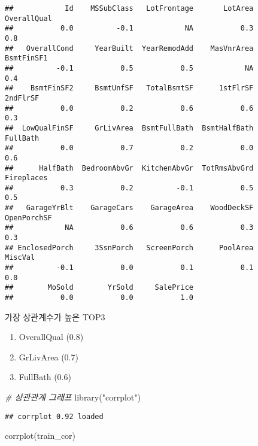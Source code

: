 \documentclass[
]{article}
\newenvironment{Shaded}{\begin{snugshade}}{\end{snugshade}}
\newcommand{\CommentTok}[1]{\textcolor[rgb]{0.56,0.35,0.01}{\textit{#1}}}
\newcommand{\FunctionTok}[1]{\textcolor[rgb]{0.00,0.00,0.00}{#1}}
\newcommand{\NormalTok}[1]{#1}
\newcommand{\StringTok}[1]{\textcolor[rgb]{0.31,0.60,0.02}{#1}}
\providecommand{\tightlist}{%
  \setlength{\itemsep}{0pt}\setlength{\parskip}{0pt}}
\begin{document}
\begin{verbatim}
##            Id    MSSubClass   LotFrontage       LotArea   OverallQual 
##           0.0          -0.1            NA           0.3           0.8 
##   OverallCond     YearBuilt  YearRemodAdd    MasVnrArea    BsmtFinSF1 
##          -0.1           0.5           0.5            NA           0.4 
##    BsmtFinSF2     BsmtUnfSF   TotalBsmtSF      1stFlrSF      2ndFlrSF 
##           0.0           0.2           0.6           0.6           0.3 
##  LowQualFinSF     GrLivArea  BsmtFullBath  BsmtHalfBath      FullBath 
##           0.0           0.7           0.2           0.0           0.6 
##      HalfBath  BedroomAbvGr  KitchenAbvGr  TotRmsAbvGrd    Fireplaces 
##           0.3           0.2          -0.1           0.5           0.5 
##   GarageYrBlt    GarageCars    GarageArea    WoodDeckSF   OpenPorchSF 
##            NA           0.6           0.6           0.3           0.3 
## EnclosedPorch     3SsnPorch   ScreenPorch      PoolArea       MiscVal 
##          -0.1           0.0           0.1           0.1           0.0 
##        MoSold        YrSold     SalePrice 
##           0.0           0.0           1.0
\end{verbatim}

가장 상관계수가 높은 TOP3

\begin{enumerate}
\def\labelenumi{\arabic{enumi}.}
\tightlist
\item
  OverallQual (0.8)
\item
  GrLivArea (0.7)
\item
  FullBath (0.6)
\end{enumerate}

\begin{Shaded}
\begin{Highlighting}[]
\CommentTok{\# 상관관계 그래프 }
\FunctionTok{library}\NormalTok{(}\StringTok{"corrplot"}\NormalTok{)}
\end{Highlighting}
\end{Shaded}

\begin{verbatim}
## corrplot 0.92 loaded
\end{verbatim}

\begin{Shaded}
\begin{Highlighting}[]
\FunctionTok{corrplot}\NormalTok{(train\_cor)}
\end{Highlighting}
\end{Shaded}
\end{document}
